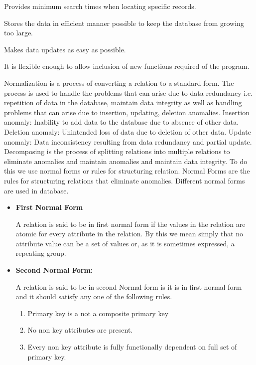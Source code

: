 Provides minimum search times when locating specific records.

Stores the data in efficient manner possible to keep the database from growing too large.

Makes data updates as easy as possible.

It is flexible enough to allow inclusion of new functions required of the program. 
 

 Normalization is a process of converting a relation to a standard form. The process is used to handle the problems that can arise due to data redundancy i.e. repetition of data in the database, maintain data integrity as well as handling problems that can arise due to insertion, updating, deletion anomalies. Insertion anomaly: Inability to add data to the database due to absence of other data. Deletion anomaly: Unintended loss of data due to deletion of other data. Update anomaly: Data inconsistency resulting from data redundancy and partial update. Decomposing is the process of splitting relations into multiple relations to eliminate anomalies and maintain anomalies and maintain data integrity. To do this we use normal forms or rules for structuring relation. Normal Forms are the rules for structuring relations that eliminate anomalies. 
 Different normal forms are used in database.

\begin{itemize}
\item {\bf First Normal Form}

A relation is said to be in first normal form if the values in the relation are atomic for every attribute in the relation. By this we mean simply that no attribute value can be a set of values or, as it is sometimes expressed, a repeating group.
\end{itemize}


\begin{itemize}
\item {\bf Second Normal Form:}

 A relation is said to be in second Normal form is it is in first normal form and it should satisfy any one of the following rules.
\begin{enumerate}
\item Primary key is a not a composite primary key
 \item  No non key attributes are present. 
\item Every non key attribute is fully functionally dependent on full set of primary key. 
\end{enumerate}
\end{itemize}

